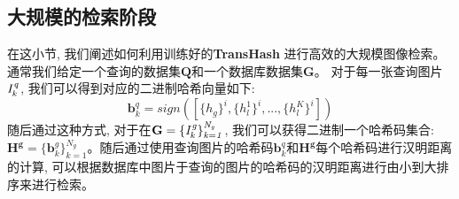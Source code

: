 \subsection{大规模的检索阶段}
在这小节, 我们阐述如何利用训练好的\textbf{TransHash} 进行高效的大规模图像检索。通常我们给定一个查询的数据集$\mathbf{Q}$和一个数据库数据集$\mathbf{G}$。 对于每一张查询图片 $\it{I}^q_{k}$, 我们可以得到对应的二进制哈希向量如下:
\begin{equation}
    \mathbf{b}^q_k = \textit{sign}([\{h_g\}^i,\{h_l^1\}^i,...,\{h_l^K\}^i])
\end{equation}
随后通过这种方式, 对于在$\mathbf{G} = \{\it{I}^g_k\}_{k=1}^{N_g} $,  我们可以获得二进制一个哈希码集合:$\mathbf{H^g} = \{\mathbf{b}_k^g\}_{k=1}^{N_g}$。随后通过使用查询图片的哈希码$\mathbf{b}^q_k$和$\mathbf{H^g} $每个哈希码进行汉明距离的计算, 可以根据数据库中图片于查询的图片的哈希码的汉明距离进行由小到大排序来进行检索。

